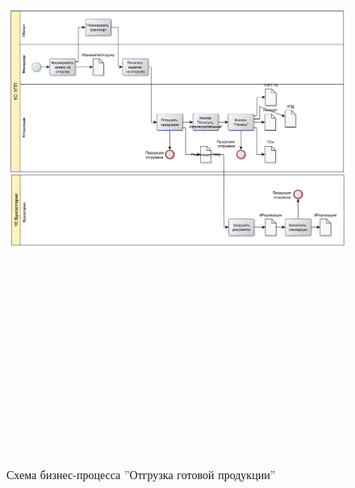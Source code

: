 \begin{figure}[!htb]
\centering
  \includegraphics[width=200mm, height=220mm, angle=90, keepaspectratio]{50_Pics/5_Shipment.pdf}
\caption{Схема бизнес-процесса ''Отгрузка готовой продукции''}
\label{pic:4_Shipment}
\end{figure} 



\clearpage




